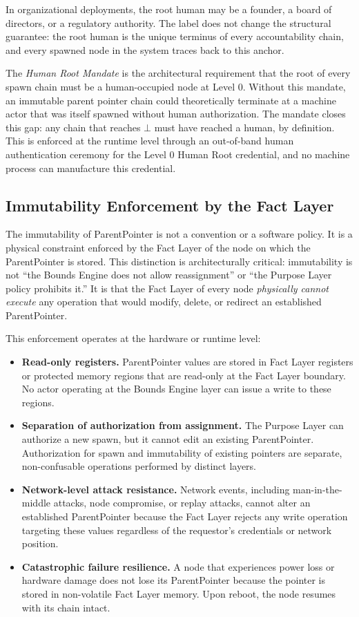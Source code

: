 In organizational deployments, the root human may be a founder, a board of directors, or a regulatory authority. The label does not change the structural guarantee: the root human is the unique terminus of every accountability chain, and every spawned node in the system traces back to this anchor.

The \textit{Human Root Mandate} is the architectural requirement that the root of every spawn chain must be a human-occupied node at Level 0. Without this mandate, an immutable parent pointer chain could theoretically terminate at a machine actor that was itself spawned without human authorization. The mandate closes this gap: any chain that reaches $\bot$ must have reached a human, by definition. This is enforced at the runtime level through an out-of-band human authentication ceremony for the Level 0 Human Root credential, and no machine process can manufacture this credential.

\subsection{Immutability Enforcement by the Fact Layer}

The immutability of ParentPointer is not a convention or a software policy. It is a physical constraint enforced by the Fact Layer of the node on which the ParentPointer is stored. This distinction is architecturally critical: immutability is not ``the Bounds Engine does not allow reassignment'' or ``the Purpose Layer policy prohibits it.'' It is that the Fact Layer of every node \textit{physically cannot execute} any operation that would modify, delete, or redirect an established ParentPointer.

This enforcement operates at the hardware or runtime level:

\begin{itemize}[noitemsep]
    \item \textbf{Read-only registers.} ParentPointer values are stored in Fact Layer registers or protected memory regions that are read-only at the Fact Layer boundary. No actor operating at the Bounds Engine layer can issue a write to these regions.
    \item \textbf{Separation of authorization from assignment.} The Purpose Layer can authorize a new spawn, but it cannot edit an existing ParentPointer. Authorization for spawn and immutability of existing pointers are separate, non-confusable operations performed by distinct layers.
    \item \textbf{Network-level attack resistance.} Network events, including man-in-the-middle attacks, node compromise, or replay attacks, cannot alter an established ParentPointer because the Fact Layer rejects any write operation targeting these values regardless of the requestor's credentials or network position.
    \item \textbf{Catastrophic failure resilience.} A node that experiences power loss or hardware damage does not lose its ParentPointer because the pointer is stored in non-volatile Fact Layer memory. Upon reboot, the node resumes with its chain intact.
\end{itemize}

